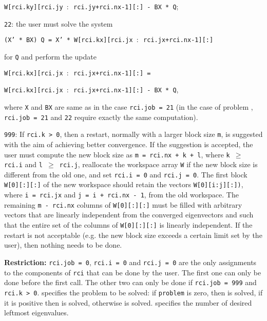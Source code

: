\begin{description}
\begin{description}
\hspace{12mm}
{\tt W[rci.ky][rci.jy $:$ rci.jy+rci.nx-1][:] - BX * Q};
%
\item
{\tt 22}: 
the user must solve the system

\hspace{8mm}
{\tt (X' * BX) Q = 
X' * W[rci.kx][rci.jx $:$ rci.jx+rci.nx-1][:]}

for {\tt Q}  and perform the update

\hspace{8mm}
{\tt W[rci.kx][rci.jx $:$ rci.jx+rci.nx-1][:] =}

\hspace{12mm}
{\tt W[rci.kx][rci.jx $:$ rci.jx+rci.nx-1][:] - BX * Q},

where {\tt X} and {\tt BX} are same as in 
the case {\tt rci.job = 21}
(in the case of problem ,
{\tt rci.job = 21} and {\tt 22} 
require exactly the same computation).
%
\item
{\tt 999}: 
If {\tt rci.k > 0}, then
a restart, normally with a larger block size {\tt m},
is suggested with the aim of achieving better convergence.
If the suggestion is accepted, the user must compute
the new block size as {\tt m = rci.nx + k + l},
where {\tt k $\ge$ rci.i} and {\tt l $\ge$ rci.j},
reallocate the workspace array {\tt W}
if the new block size is different from the old one,
and set {\tt rci.i = 0} and {\tt rci.j = 0}.
The first block {\tt W[0][:][:]} of the new
workspace should retain the vectors 
{\tt W[0][i:j][:])},
where {\tt i = rci.jx} and {\tt j = i + rci.nx - 1},
from the old workspace.
The remaining {\tt m - rci.nx} columns of {\tt W[0][:][:]}
must be filled
with arbitrary vectors that are linearly independent from 
the converged eigenvectors and such that
the entire set of the columns of {\tt W[0][:][:]}
is linearly independent.
If the restart is not acceptable
(e.g. the new block size exceeds a certain limit set by the user), 
then nothing needs to be done.
%
\end{description}
%
{\bf Restriction:} 
{\tt rci.job = 0}, 
{\tt rci.i = 0} and
{\tt rci.j = 0} 
are the only %
assignments to the components of {\tt rci}
that can be done
by the user.
The first one can only be done before the first call.
The other two can only be done if
{\tt rci.job = 999} and {\tt rci.k > 0}.
%
 specifies the problem to be solved:
if {\tt problem} is zero, then  is solved,
if it is positive then  is solved,
otherwise  is solved.
%
 specifies the number of desired leftmost eigenvalues.

\end{description}
